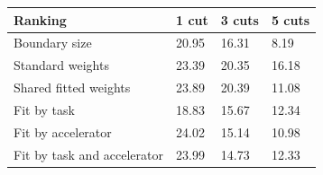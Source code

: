 \begin{tabular}{@{}llll@{}}
\toprule
Ranking & 1 cut & 3 cuts & 5 cuts \\
\midrule
Boundary size & 20.95 & 16.31 & 8.19 \\
Standard weights & 23.39 & 20.35 & 16.18 \\
Shared fitted weights & 23.89 & 20.39 & 11.08 \\
Fit by task & 18.83 & 15.67 & 12.34 \\
Fit by accelerator & 24.02 & 15.14 & 10.98 \\
Fit by task and accelerator & 23.99 & 14.73 & 12.33 \\
\bottomrule
\end{tabular}
